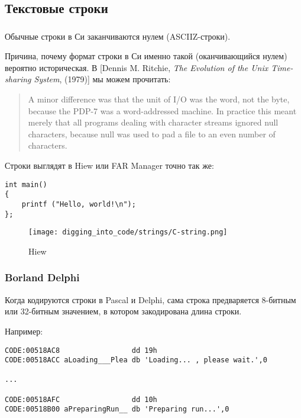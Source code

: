 \subsection{Текстовые строки}

\subsubsection{\CCpp}

\label{C_strings}
Обычные строки в Си заканчиваются нулем (\ac{ASCIIZ}-строки).

Причина, почему формат строки в Си именно такой (оканчивающийся нулем) вероятно историческая.
В [Dennis M. Ritchie, \emph{The Evolution of the Unix Time-sharing System}, (1979)]
мы можем прочитать:

\begin{framed}
\begin{quotation}
A minor difference was that the unit of I/O was the word, not the byte, because the PDP-7 was a word-addressed
machine. In practice this meant merely that all programs dealing with character streams ignored null
characters, because null was used to pad a file to an even number of characters.
\end{quotation}
\end{framed}

Строки выглядят в Hiew или FAR Manager точно так же:

\begin{lstlisting}[style=customc]
int main()
{
	printf ("Hello, world!\n");
};
\end{lstlisting}

\begin{figure}[H]
\centering
\texttt{[image: digging\_into\_code/strings/C-string.png]}
\caption{Hiew}
\end{figure}


\subsubsection{Borland Delphi}
Когда кодируются строки в Pascal и Delphi, сама строка предваряется 8-битным или 32-битным значением, в котором закодирована длина строки.

Например:

\begin{lstlisting}[caption=Delphi,style=customasmx86]
CODE:00518AC8                 dd 19h
CODE:00518ACC aLoading___Plea db 'Loading... , please wait.',0

...

CODE:00518AFC                 dd 10h
CODE:00518B00 aPreparingRun__ db 'Preparing run...',0
\end{lstlisting}

